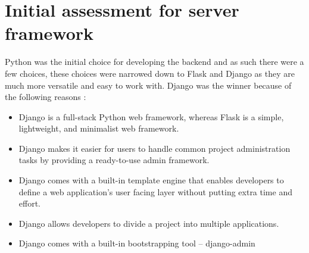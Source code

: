 \section{Initial assessment for server framework}
{\normalsize Python was the initial choice for developing the backend and as such there were a few choices, these choices were narrowed down to Flask and Django as they are much more versatile and easy to work with. Django was the winner because of the following reasons : 

\begin{itemize}
    \item Django is a full-stack Python web framework, whereas Flask is a simple, lightweight, and minimalist web framework.
    \item Django makes it easier for users to handle common project administration tasks by providing a ready-to-use admin framework.
    \item Django comes with a built-in template engine that enables developers to define a web application’s user facing layer without putting extra time and effort.
    \item Django allows developers to divide a project into multiple applications.
    \item Django comes with a built-in bootstrapping tool – django-admin
\end{itemize}
}
